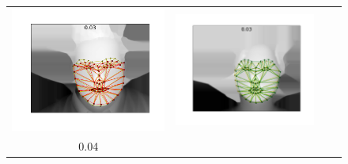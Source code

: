 \begin{figure}
{\begin{tabular}{cccc}
    \includegraphics[valign=m,scale=0.16]{statistical_normals/images/lk2d/aam_error_examples/normals_003_208}    &
    \includegraphics[valign=m,scale=0.16]{statistical_normals/images/lk2d/aam_error_examples/spherical_003_484}  \\
    0.04                                                                                                         &

\end{tabular}}
\end{figure}
